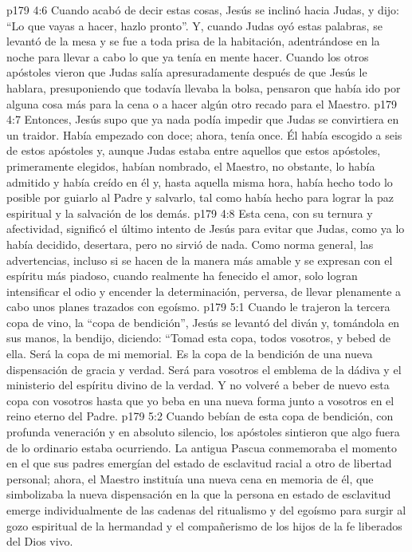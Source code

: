 \vs p179 4:6 Cuando acabó de decir estas cosas, Jesús se inclinó hacia Judas, y dijo: “Lo que vayas a hacer, hazlo pronto”. Y, cuando Judas oyó estas palabras, se levantó de la mesa y se fue a toda prisa de la habitación, adentrándose en la noche para llevar a cabo lo que ya tenía en mente hacer. Cuando los otros apóstoles vieron que Judas salía apresuradamente después de que Jesús le hablara, presuponiendo que todavía llevaba la bolsa, pensaron que había ido por alguna cosa más para la cena o a hacer algún otro recado para el Maestro.
\vs p179 4:7 \pc Entonces, Jesús supo que ya nada podía impedir que Judas se convirtiera en un traidor. Había empezado con doce; ahora, tenía once. Él había escogido a seis de estos apóstoles y, aunque Judas estaba entre aquellos que estos apóstoles, primeramente elegidos, habían nombrado, el Maestro, no obstante, lo había admitido y había creído en él y, hasta aquella misma hora, había hecho todo lo posible por guiarlo al Padre y salvarlo, tal como había hecho para lograr la paz espiritual y la salvación de los demás.
\vs p179 4:8 Esta cena, con su ternura y afectividad, significó el último intento de Jesús para evitar que Judas, como ya lo había decidido, desertara, pero no sirvió de nada. Como norma general, las advertencias, incluso si se hacen de la manera más amable y se expresan con el espíritu más piadoso, cuando realmente ha fenecido el amor, solo logran intensificar el odio y encender la determinación, perversa, de llevar plenamente a cabo unos planes trazados con egoísmo.
\vs p179 5:1 Cuando le trajeron la tercera copa de vino, la “copa de bendición”, Jesús se levantó del diván y, tomándola en sus manos, la bendijo, diciendo: “Tomad esta copa, todos vosotros, y bebed de ella. Será la copa de mi memorial. Es la copa de la bendición de una nueva dispensación de gracia y verdad. Será para vosotros el emblema de la dádiva y el ministerio del espíritu divino de la verdad. Y no volveré a beber de nuevo esta copa con vosotros hasta que yo beba en una nueva forma junto a vosotros en el reino eterno del Padre.
\vs p179 5:2 Cuando bebían de esta copa de bendición, con profunda veneración y en absoluto silencio, los apóstoles sintieron que algo fuera de lo ordinario estaba ocurriendo. La antigua Pascua conmemoraba el momento en el que sus padres emergían del estado de esclavitud racial a otro de libertad personal; ahora, el Maestro instituía una nueva cena en memoria de él, que simbolizaba la nueva dispensación en la que la persona en estado de esclavitud emerge individualmente de las cadenas del ritualismo y del egoísmo para surgir al gozo espiritual de la hermandad y el compañerismo de los hijos de la fe liberados del Dios vivo.
